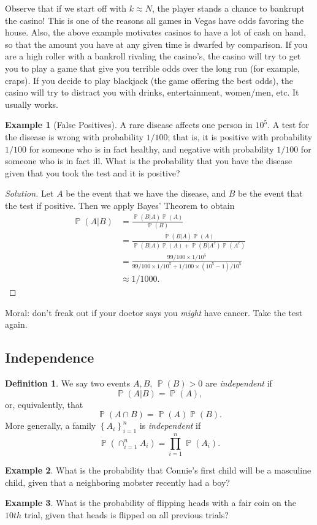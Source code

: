 \documentclass[12pt]{article}
\DeclareMathOperator{\prob}{\mathbb{P}}
\theoremstyle{plain}
\theoremstyle{definition}
\newtheorem*{definition}{Definition}
\newtheorem*{example}{Example}
\theoremstyle{remark}
\numberwithin{equation}{section}  %
\begin{document}
Observe that if we start off with $k \approx N$, the player stands a chance to
bankrupt the casino! This is one of the reasons all games in Vegas have odds
favoring the house. Also, the above example motivates casinos to have a lot of
cash on hand, so that the amount you have at any given time is dwarfed by
comparison. If you are a high roller with a bankroll rivaling the casino's,
the casino will try to get you to play a game that give you terrible odds over
the long run (for example, craps). If you decide to play blackjack (the game
offering the best odds), the casino will try to distract you with drinks,
entertainment, women/men, etc. It usually works.
\begin{example}[False Positives]
	A rare disease affects one person in $10^5$. A test for the disease
	is wrong with probability $1/100$; that is, it is positive with probability
	$1/100$ for someone who is in fact healthy, and negative
	with probability $1/100$ for someone who is in fact ill. What is the 
	probability
	that you have the disease given that you took the test and it is positive?
\end{example}
\begin{proof}[Solution]
	Let $A$ be the event that we have the disease, and $B$ be the event
	that the test if positive. Then we apply
	Bayes' Theorem to obtain
	\begin{align*}
		\prob(A | B) & = \frac{\prob(B | A) \prob(A)}{\prob(B)}
		\\
		& = \frac{\prob(B | A) \prob(A)}{\prob(B|A) \prob(A) + \prob(B | A^c)
		\prob(A^c)}
		\\
		& = \frac{99/100 \times 1/10^5}{99/100 \times 1/10^5 + 1/100 \times 
			(10^5 -
		1)/10^5}
		\\
		& \approx 1/1000.
	\end{align*}
\end{proof}
Moral: don't freak out if your doctor says you \emph{might} have
cancer. Take the test again.
\subsection{Independence}
\begin{definition}
	We say two events $A, B$, $\prob(B) > 0$ are \emph{independent} if 
	\[\prob(A |
	B) = \prob(A),\] or, equivalently, that \[\prob(A \cap B) = \prob(A) 
	\prob(B).\] More generally,
	a family $ {\left\{ A_i \right\}}_{i = 1}^n $ is
	\emph{independent} if 
	\[ \prob(\cap_{i = 1}^n A_i) = \prod_{i = 1}^n \prob(A_i).\]
\end{definition}
\begin{example}
	What is the probability that Connie's first child will be a masculine child,
	given that a neighboring mobster recently had a boy?
\end{example}
\begin{example}
	What is the probability of flipping heads with a fair coin on the $10th$ 
	trial,
	given that heads is flipped on all previous trials?
\end{example}
\end{document}
